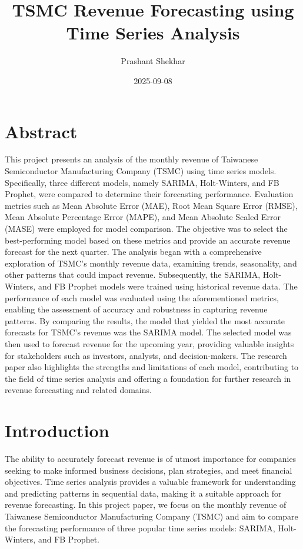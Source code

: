 \documentclass[
]{article}
\title{TSMC Revenue Forecasting using Time Series Analysis}
\author{Prashant Shekhar}
\date{2025-09-08}
\begin{document}
\maketitle

{
\setcounter{tocdepth}{2}
\tableofcontents
}
\hypertarget{abstract}{%
\section{Abstract}\label{abstract}}

This project presents an analysis of the monthly revenue of Taiwanese
Semiconductor Manufacturing Company (TSMC) using time series models.
Specifically, three different models, namely SARIMA, Holt-Winters, and
FB Prophet, were compared to determine their forecasting performance.
Evaluation metrics such as Mean Absolute Error (MAE), Root Mean Square
Error (RMSE), Mean Absolute Percentage Error (MAPE), and Mean Absolute
Scaled Error (MASE) were employed for model comparison. The objective
was to select the best-performing model based on these metrics and
provide an accurate revenue forecast for the next quarter. The analysis
began with a comprehensive exploration of TSMC's monthly revenue data,
examining trends, seasonality, and other patterns that could impact
revenue. Subsequently, the SARIMA, Holt-Winters, and FB Prophet models
were trained using historical revenue data. The performance of each
model was evaluated using the aforementioned metrics, enabling the
assessment of accuracy and robustness in capturing revenue patterns. By
comparing the results, the model that yielded the most accurate
forecasts for TSMC's revenue was the SARIMA model. The selected model
was then used to forecast revenue for the upcoming year, providing
valuable insights for stakeholders such as investors, analysts, and
decision-makers. The research paper also highlights the strengths and
limitations of each model, contributing to the field of time series
analysis and offering a foundation for further research in revenue
forecasting and related domains.

\hypertarget{introduction}{%
\section{Introduction}\label{introduction}}

The ability to accurately forecast revenue is of utmost importance for
companies seeking to make informed business decisions, plan strategies,
and meet financial objectives. Time series analysis provides a valuable
framework for understanding and predicting patterns in sequential data,
making it a suitable approach for revenue forecasting. In this project
paper, we focus on the monthly revenue of Taiwanese Semiconductor
Manufacturing Company (TSMC) and aim to compare the forecasting
performance of three popular time series models: SARIMA, Holt-Winters,
and FB Prophet.
\end{document}
